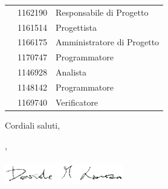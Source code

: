 \documentclass[12pt]{letter}
\begin{document}
\begin{letter}
{\begin{longtable}{ C{4cm} C{3cm} C{6cm} }
                \LD{} & 1162190 & Responsabile di Progetto \\
                \CE{} & 1161514 & Progettista \\
                \SE{} & 1166175 & Amministratore di Progetto \\
                \PF{} & 1170747 & Programmatore \\
                \DF{} & 1146928 & Analista \\
                \BR{} & 1148142 & Programmatore \\
                \AT{} & 1169740 & Verificatore \\  
            \end{longtable}
        }
        Cordiali saluti,
        \closing{\LD{}, \\ \textit{\Responsabile{}}\\ \includegraphics[width=.6\linewidth]{../DocumentazioneEsterna/PianoDiProgetto/Sezioni/Immagini/Firme/Davide.png}}
        \vspace{10mm}
    \end{letter}
\end{document}
